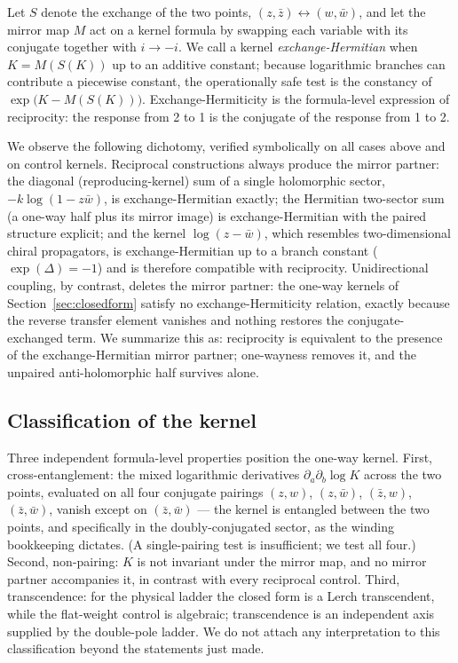 \documentclass[11pt,a4paper]{article}
\newcommand{\zb}{\bar{z}}
\newcommand{\wb}{\bar{w}}
\begin{document}
Let $S$ denote the exchange of the two points, $(z, \zb) \leftrightarrow (w, \wb)$,
and let the mirror map $M$ act on a kernel formula by swapping each variable with
its conjugate together with $i \to -i$. We call a kernel
\emph{exchange-Hermitian} when $K = M(S(K))$ up to an additive constant; because
logarithmic branches can contribute a piecewise constant, the operationally safe
test is the constancy of $\exp\!\bigl(K - M(S(K))\bigr)$. Exchange-Hermiticity
is the formula-level expression of reciprocity: the response from 2 to 1 is the
conjugate of the response from 1 to 2.

We observe the following dichotomy, verified symbolically on all cases above
and on control kernels. Reciprocal constructions always produce the mirror
partner: the diagonal (reproducing-kernel) sum of a single holomorphic sector,
$-k \log(1 - z\wb)$, is exchange-Hermitian exactly; the Hermitian two-sector sum
(a one-way half plus its mirror image) is exchange-Hermitian with the paired
structure explicit; and the kernel $\log(z - \wb)$, which resembles
two-dimensional chiral propagators, is exchange-Hermitian up to a branch
constant ($\exp(\Delta) = -1$) and is therefore compatible with reciprocity.
Unidirectional coupling, by contrast, deletes the mirror partner: the one-way
kernels of Section~\ref{sec:closedform} satisfy no exchange-Hermiticity
relation, exactly because the reverse transfer element vanishes and nothing
restores the conjugate-exchanged term. We summarize this as: reciprocity is
equivalent to the presence of the exchange-Hermitian mirror partner;
one-wayness removes it, and the unpaired anti-holomorphic half survives alone.

\subsection{Classification of the kernel}

Three independent formula-level properties position the one-way kernel. First,
cross-entanglement: the mixed logarithmic derivatives
$\partial_a \partial_b \log K$ across the two points, evaluated on all four
conjugate pairings $(z,w)$, $(z,\wb)$, $(\zb,w)$, $(\zb,\wb)$, vanish except on
$(\zb, \wb)$ --- the kernel is entangled between the two points, and
specifically in the doubly-conjugated sector, as the winding bookkeeping
dictates. (A single-pairing test is insufficient; we test all four.) Second,
non-pairing: $K$ is not invariant under the mirror map, and no mirror partner
accompanies it, in contrast with every reciprocal control. Third,
transcendence: for the physical ladder the closed form is a Lerch transcendent,
while the flat-weight control is algebraic; transcendence is an independent
axis supplied by the double-pole ladder. We do not attach any interpretation to
this classification beyond the statements just made.
\end{document}
